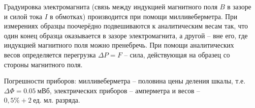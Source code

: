 \documentclass[a4paper, 12pt]{article}
\begin{document}
    Градуировка электромагнита (связь между индукцией магнитного поля $B$ в зазоре и силой тока $I$ в обмотках) производится при помощи милливеберметра. При измерениях образцы поочерёдно подвешиваются к аналитическим весам так, что один конец образца оказывается в зазоре электромагнита, а другой -- вне его, где индукцией магнитного поля можно пренебречь. При помощи аналитических весов определяется перегрузка $\Delta P=F$ -- сила, действующая на образец со стороны магнитного поля.

    Погрешности приборов: милливеберметра -- половина цены деления шкалы, т.е. $\Delta\Phi=0.05~\text{мВб}$, электрических приборов -- амперметра и весов -- $0,5\%+2~\text{ед. мл. разряда}$.
\end{document}
